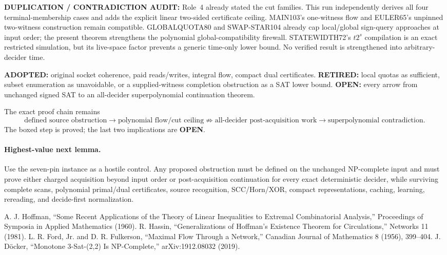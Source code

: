 \documentclass[11pt]{article}
\newcommand{\OPEN}{\textbf{OPEN}}
\begin{document}
\textbf{DUPLICATION / CONTRADICTION AUDIT:} Role~4 already stated the cut families.  This run independently derives all four terminal-membership cases and adds the explicit linear two-sided certificate ceiling.  MAIN103's one-witness flow and EULER65's unpinned two-witness construction remain compatible.  GLOBALQUOTA80 and SWAP-STAR104 already cap local/global sign-query approaches at input order; the present theorem strengthens the polynomial global-compatibility firewall.  STATEWIDTH72's $t2^s$ compilation is an exact restricted simulation, but its live-space factor prevents a generic time-only lower bound.  No verified result is strengthened into arbitrary-decider time.

\textbf{ADOPTED:} original socket coherence, paid reads/writes, integral flow, compact dual certificates.  \textbf{RETIRED:} local quotas as sufficient, subset enumeration as unavoidable, or a supplied-witness completion obstruction as a SAT lower bound.  \textbf{OPEN:} every arrow from unchanged signed SAT to an all-decider superpolynomial continuation theorem.

The exact proof chain remains
\[
\text{defined source obstruction}
\longrightarrow
\boxed{\text{polynomial flow/cut ceiling}}
\not\Longrightarrow
\text{all-decider post-acquisition work}
\longrightarrow
\text{superpolynomial contradiction}.
\]
The boxed step is proved; the last two implications are \OPEN{}.

\paragraph{Highest-value next lemma.}
Use the seven-pin instance as a hostile control.  Any proposed obstruction must be defined on the unchanged NP-complete input and must prove either charged acquisition beyond input order or post-acquisition continuation for every exact deterministic decider, while surviving complete scans, polynomial primal/dual certificates, source recognition, SCC/Horn/XOR, compact representations, caching, learning, rereading, and decide-first normalization.

\begin{thebibliography}{4}
 A. J. Hoffman, ``Some Recent Applications of the Theory of Linear Inequalities to Extremal Combinatorial Analysis,'' Proceedings of Symposia in Applied Mathematics (1960).
 R. Hassin, ``Generalizations of Hoffman's Existence Theorem for Circulations,'' Networks 11 (1981).
 L. R. Ford, Jr. and D. R. Fulkerson, ``Maximal Flow Through a Network,'' Canadian Journal of Mathematics 8 (1956), 399--404.
 J. D\"ocker, ``Monotone 3-Sat-(2,2) Is NP-Complete,'' arXiv:1912.08032 (2019).
\end{thebibliography}
\end{document}
